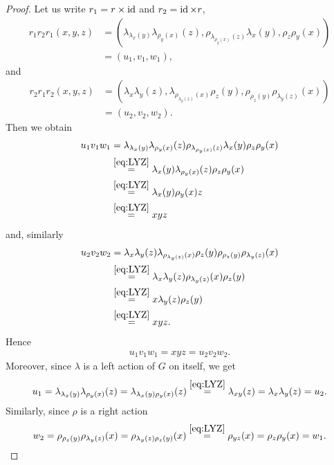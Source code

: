     \begin{proof}
    Let us write $r_1=r\times \operatorname{id}$ and $r_2=\operatorname{id} \times r$,  
    \begin{align*}
         r_1r_2r_1(x,y,z)&= (\lambda_{\lambda_x(y)}\lambda_{\rho_y(x)}(z),\rho_{\lambda_{\rho_y(x)}(z)}\lambda_x(y),\rho_z\rho_y(x)) \\&=(u_1,v_1,w_1),
    \end{align*}
    and
    \begin{align*}
        r_2r_1r_2(x,y,z)&=(\lambda_x\lambda_y(z),\lambda_{\rho_{\lambda_y(z)}(x)}\rho_z(y),\rho_{\rho_z(y)}\rho_{\lambda_y(z)}(x))\\&=(u_2,v_2,w_2).
    \end{align*}
    Then we obtain
    \begin{align*}
        u_1v_1w_1 &= \lambda_{\lambda_x(y)}\lambda_{\rho_y(x)}(z)\rho_{\lambda_{\rho_y(x)}(z)}\lambda_x(y)\rho_z\rho_y(x)\\
        &\overset{\eqref{eq:LYZ}}{=}\lambda_x(y)\lambda_{\rho_y(x)}(z)\rho_z\rho_y(x)\\
        &\overset{\eqref{eq:LYZ}}{=}\lambda_x(y)\rho_y(x)z\\
        &\overset{\eqref{eq:LYZ}}{=}xyz
    \end{align*}
    and, similarly 
    \begin{align*}
        u_2v_2w_2 &=\lambda_x\lambda_y(z)\lambda_{\rho_{\lambda_y(z)}(x)}\rho_z(y)\rho_{\rho_z(y)}\rho_{\lambda_y(z)}(x)\\
        &\overset{\eqref{eq:LYZ}}{=}\lambda_x\lambda_y(z)\rho_{\lambda_y(z)}(x)\rho_z(y)
        \\
        &\overset{\eqref{eq:LYZ}}{=}x\lambda_y(z)\rho_z(y)\\
        &\overset{\eqref{eq:LYZ}}{=} xyz.
    \end{align*}
    Hence
    \begin{align}\label{eq:LYXproduct}
        u_1v_1w_1 =  xyz = u_2v_2w_2.
    \end{align}
    Moreover, since $\lambda$ is a left action of $G$ on itself, we  get
    \begin{align*}
        u_1=\lambda_{\lambda_x(y)}\lambda_{\rho_y(x)} (z) 
        = \lambda_{\lambda_{x}(y)\rho_y(x)}(z) 
        \overset{\eqref{eq:LYZ}}{=}\lambda_{xy}(z) = \lambda_x\lambda_y(z)=u_2.
    \end{align*}
    Similarly, since $\rho$ is a right action
    \begin{align*}
        w_2 = \rho_{\rho_z(y)}\rho_{\lambda_y(z)}(x) = \rho_{\lambda_y(z)\rho_z(y)} (x)\overset{\eqref{eq:LYZ}}{=} \rho_{yz}(x) = \rho_z\rho_y(x) = w_1.

\end{align*}
\end{proof}
